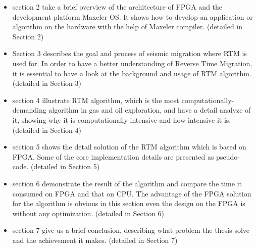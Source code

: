 \begin{itemize}
  \item section 2 take a brief overview of the architecture of FPGA and the
    development platform Maxeler OS. It shows how to develop an application
    or algorithm on the hardware with the help of Maxeler compiler.
    (detailed in Section 2)

 \item Section 3 describes the goal and process of seismic migration
   where RTM is used for. In order to have a better understanding of 
   Reverse Time Migration,
   it is essential to have a look at the background and usage of RTM
   algorithm.  (detailed in Section 3)

 \item section 4 illustrate RTM algorithm, which is the most 
   computationally-demanding algorithm in gas and oil
   exploration,   and have a detail
   analyze of it, showing why it is computationally-intensive and how
   intensive it is. (detailed in Section 4)

 \item section 5 shows the detail solution of the RTM algorithm which
   is based on FPGA. Some of the core implementation details are
   presented as pseudo-code. (detailed in Section 5)

 \item section 6 demonstrate the result of the algorithm and compare the
   time it consumed on FPGA and that on CPU. The advantage of the FPGA
   solution for the algorithm is obvious in this section even the design
   on the FPGA is without any optimization. (detailed in Section 6)

 \item section 7 give us a brief conclusion,
   describing what problem the thesis solve and the achievement it makes. 
   (detailed in Section 7)
\end{itemize}


